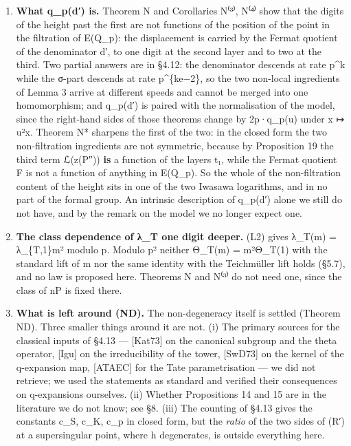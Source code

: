 \documentclass[11pt,a4paper]{article}
\theoremstyle{named}
\begin{document}
\begin{enumerate}[leftmargin=1.4em,itemsep=.2em,topsep=.3em]
\item \textbf{What q\_p(d′) is.} Theorem N and Corollaries N⁽³⁾, N⁽⁴⁾ show that the digits of the height past the first are not functions of the position of the point in the filtration of E(Q\_p): the displacement is carried by the Fermat quotient of the denominator d′, to one digit at the second layer and to two at the third. Two partial answers are in §4.12: the denominator descends at rate p\textasciicircum{}k while the σ-part descends at rate p\textasciicircum{}\{ke−2\}, so the two non-local ingredients of Lemma 3 arrive at different speeds and cannot be merged into one homomorphism; and q\_p(d′) is paired with the normalisation of the model, since the right-hand sides of those theorems change by 2p·q\_p(u) under x ↦ u²x. Theorem N* sharpens the first of the two: in the closed form the two non-filtration ingredients are not symmetric, because by Proposition 19 the third term ℒ(z(P″)) \textbf{is} a function of the layers t₁, while the Fermat quotient F is not a function of anything in E(Q\_p). So the whole of the non-filtration content of the height sits in one of the two Iwasawa logarithms, and in no part of the formal group. An intrinsic description of q\_p(d′) alone we still do not have, and by the remark on the model we no longer expect one.
\item \textbf{The class dependence of λ\_T one digit deeper.} (L2) gives λ\_T(m) = λ\_\{T,1\}m² modulo p. Modulo p² neither Θ\_T(m) = m²Θ\_T(1) with the standard lift of m nor the same identity with the Teichmüller lift holds (§5.7), and no law is proposed here. Theorems N and N⁽³⁾ do not need one, since the class of nP is fixed there.
\item \textbf{What is left around (ND).} The non-degeneracy itself is settled (Theorem ND). Three smaller things around it are not. (i) The primary sources for the classical inputs of §4.13 — [Kat73] on the canonical subgroup and the theta operator, [Igu] on the irreducibility of the tower, [SwD73] on the kernel of the q-expansion map, [ATAEC] for the Tate parametrisation — we did not retrieve; we used the statements as standard and verified their consequences on q-expansions ourselves. (ii) Whether Propositions 14 and 15 are in the literature we do not know; see §8. (iii) The counting of §4.13 gives the constants c\_S, c\_K, c\_p in closed form, but the \textit{ratio} of the two sides of (R′) at a supersingular point, where h degenerates, is outside everything here.

\end{enumerate}
\end{document}
